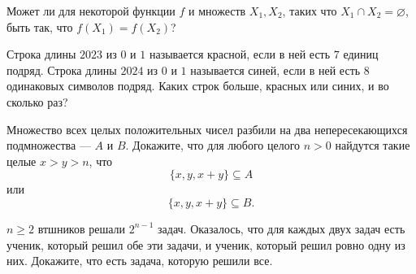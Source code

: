 \begin{problems}
\item Может ли для некоторой функции $f$ и множеств $X_1,X_2$, таких что $X_1\cap X_2=\varnothing$, быть так, что $f(X_1)=f(X_2)$?

\item Строка длины $2023$ из $0$ и $1$ называется красной, если в ней есть $7$ единиц подряд. Строка длины $2024$ из $0$ и $1$ называется синей, если в ней есть $8$ одинаковых символов подряд. Каких строк больше, красных или синих, и во сколько раз?

\item Множество всех целых положительных чисел разбили на два непересекающихся подмножества --- $A$ и $B$. Докажите, что для любого целого $n>0$ найдутся такие целые $x>y>n$, что
\[
\{x,y,x+y\}\subseteq A
\]
или
\[
\{x,y,x+y\}\subseteq B.
\]

\item  $n \geq 2$ втшников решали $2^{n-1}$ задач. Оказалось, что для каждых двух задач есть ученик, который решил обе эти задачи, и ученик, который решил ровно одну из них. Докажите, что есть задача, которую решили все.


\end{problems}
